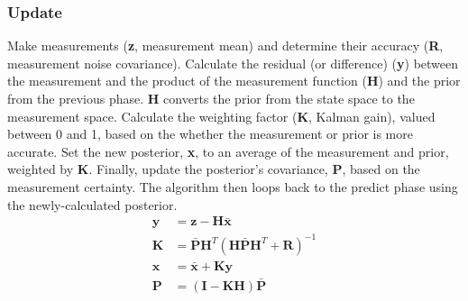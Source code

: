\documentclass[12pt,letterpaper,titlepage]{report}
\begin{document}
\subsubsection*{Update}
Make measurements (\textbf{z}, measurement mean) and determine their accuracy (\textbf{R}, measurement noise covariance). Calculate the residual (or difference) (\textbf{y}) between the measurement and the product of the measurement function (\textbf{H}) and the prior from the previous phase. \textbf{H} converts the prior from the state space to the measurement space. Calculate the weighting factor (\textbf{K}, Kalman gain), valued between 0 and 1, based on the whether the measurement or prior is more accurate. Set the new posterior, \textbf{x}, to an average of the measurement and prior, weighted by \textbf{K}. Finally, update the posterior's covariance, \textbf{P}, based on the measurement certainty. The algorithm then loops back to the predict phase using the newly-calculated posterior.
\begin{align*}
\textbf{y} &= \textbf{z} - \textbf{H}\bar{\textbf{x}}\\
\textbf{K} &= \bar{\textbf{P}}\textbf{H}^T(\textbf{H}\bar{\textbf{P}}\textbf{H}^T+\textbf{R})^{-1}\\
\textbf{x} &= \bar{\textbf{x}} + \textbf{Ky}\\
\textbf{P} &= (\textbf{I}-\textbf{KH})\bar{\textbf{P}}\\
\end{align*}
\end{document}
